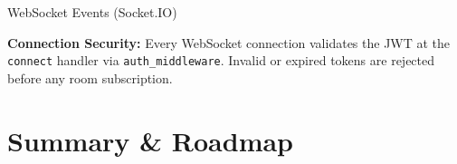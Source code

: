 \documentclass[aspectratio=169,12pt]{beamer}
\begin{document}
\begin{frame}{WebSocket Events (Socket.IO)}
\vspace{6pt}
\begin{tcolorbox}[colback=BPDark!5,colframe=BPDark,arc=4pt,
  left=6pt,right=6pt,top=3pt,bottom=3pt]
\scriptsize\centering
\textbf{Connection Security:} Every WebSocket connection validates the JWT at the \texttt{connect} handler via \texttt{auth\_middleware}. Invalid or expired tokens are rejected before any room subscription.
\end{tcolorbox}
\end{frame}

\section{Summary \& Roadmap}
\end{document}
